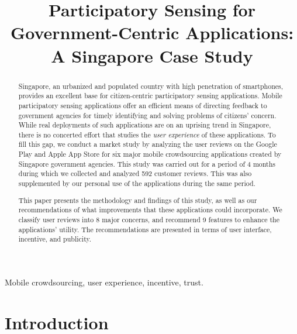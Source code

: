 \documentclass[conference,10pt]{IEEEtran}
\begin{document}
\title{Participatory Sensing for Government-Centric Applications: A Singapore Case Study}

\author{
\and
{}
}

\maketitle
\thispagestyle{firstpage}

\begin{abstract}
Singapore, an urbanized and populated country with high penetration of smartphones, provides an excellent base for citizen-centric participatory sensing applications. Mobile participatory sensing applications offer an efficient means of directing feedback to government agencies for timely identifying and solving problems of citizens' concern. While real deployments of such applications are on an uprising trend in Singapore, there is no concerted effort that studies the {\em user experience} of these applications. To fill this gap, we conduct a market study by analyzing the user reviews on the Google Play and Apple App Store for six major mobile crowdsourcing applications created by Singapore government agencies. This study was carried out for a period of 4 months during which we collected and analyzed 592 customer reviews. This was also supplemented by our personal use of the applications during the same period.

This paper presents the methodology and findings of this study, as well as our recommendations of what improvements that these applications could incorporate. We classify user reviews into 8 major concerns, and recommend 9 features to enhance the applications' utility. The recommendations are presented in terms of user interface, incentive, and publicity.
\end{abstract}

\begin{IEEEkeywords}
Mobile crowdsourcing, user experience, incentive, trust.
\end{IEEEkeywords}


\section{Introduction}\label{sec:introduction}
\end{document}
